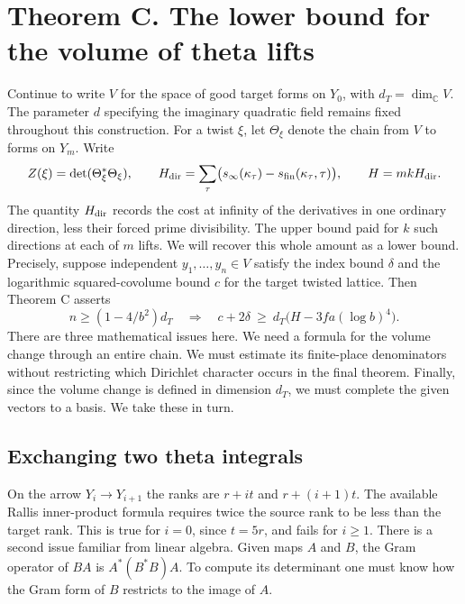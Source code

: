 \section{Theorem C. The lower bound for the volume of theta lifts}
\label{sec:arithmetic-lower}
Continue to write $V$ for the space of good target forms on $Y_0$, with $d_T=\dim_{\mathbb C}V$.
The parameter $d$ specifying the imaginary quadratic field remains fixed throughout this construction.
For a twist $\xi$, let $\Theta_\xi$ denote the chain from $V$ to forms on $Y_m$. Write
\[
 Z(\xi)=\det(\Theta_\xi^*\Theta_\xi),\qquad
 H_{\rm dir}=\sum_\tau\bigl(s_\infty(\kappa_\tau)-
                      s_{\rm fin}(\kappa_\tau,\tau)\bigr),
 \qquad H=mkH_{\rm dir}.
\]
The quantity $H_{\rm dir}$ records the cost at infinity of the derivatives in one ordinary direction, less their forced prime divisibility. The upper bound paid for $k$ such directions at each of $m$ lifts. We will recover this whole amount as a lower bound. Precisely, suppose independent $y_1,\ldots,y_n\in V$ satisfy the index bound $\delta$ and the logarithmic squared-covolume bound $c$ for the target twisted lattice. Then Theorem C asserts
\begin{equation}
 n\ge (1-4/b^2)d_T\quad\Longrightarrow\quad
 c+2\delta\ \ge\ d_T\bigl(H-3fa(\log b)^4\bigr).
 \label{eq:lowlong}
\end{equation}
There are three mathematical issues here. We need a formula for the volume change through an entire chain. We must estimate its finite-place denominators without restricting which Dirichlet character occurs in the final theorem. Finally, since the volume change is defined in dimension $d_T$, we must complete the given vectors to a basis. We take these in turn.

\subsection{Exchanging two theta integrals}
On the arrow $Y_i\to Y_{i+1}$ the ranks are $r+it$ and $r+(i+1)t$.
The available Rallis inner-product formula requires twice the source rank to be less than the target rank. This is true for $i=0$, since $t=5r$, and fails for $i\ge1$. There is a second issue familiar from linear algebra. Given maps $A$ and $B$, the Gram operator of $BA$ is $A^*(B^*B)A$. To compute its determinant one must know how the Gram form of $B$ restricts to the image of $A$.

